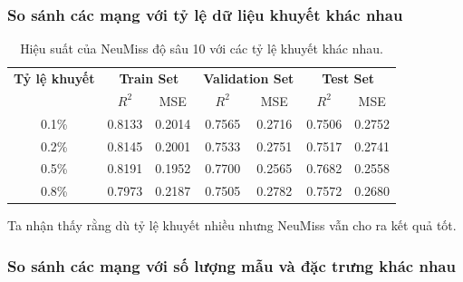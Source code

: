 \subsubsection*{So sánh các mạng với tỷ lệ dữ liệu khuyết khác nhau}
\begin{table}[h!]
\centering
\setlength{\tabcolsep}{8pt}
\begin{tabular}{ccccccc}
\toprule
\textbf{Tỷ lệ khuyết} & \multicolumn{2}{c}{\textbf{Train Set}} & \multicolumn{2}{c}{\textbf{Validation Set}} & \multicolumn{2}{c}{\textbf{Test Set}} \\
\cmidrule(lr){2-3}\cmidrule(lr){4-5}\cmidrule(lr){6-7}
  & $R^2$ & MSE & $R^2$ & MSE & $R^2$ & MSE \\
\midrule
0.1\% & 0.8133 & 0.2014 & 0.7565 & 0.2716 & 0.7506 & 0.2752 \\
0.2\% & 0.8145 & 0.2001 & 0.7533 & 0.2751 & 0.7517 & 0.2741 \\
0.5\% & 0.8191 & 0.1952 & 0.7700 & 0.2565 & 0.7682 & 0.2558 \\
0.8\% & 0.7973 & 0.2187 & 0.7505 & 0.2782 & 0.7572 & 0.2680 \\
\bottomrule
\end{tabular}
\captionsetup{justification=centering, width=\linewidth}
\caption{Hiệu suất của NeuMiss độ sâu 10 với các tỷ lệ khuyết khác nhau.}
\label{tab:performance_missing_rates}
\end{table}

Ta nhận thấy rằng dù tỷ lệ khuyết nhiều nhưng NeuMiss vẫn cho ra kết quả tốt.


\subsubsection*{So sánh các mạng với số lượng mẫu và đặc trưng khác nhau}


